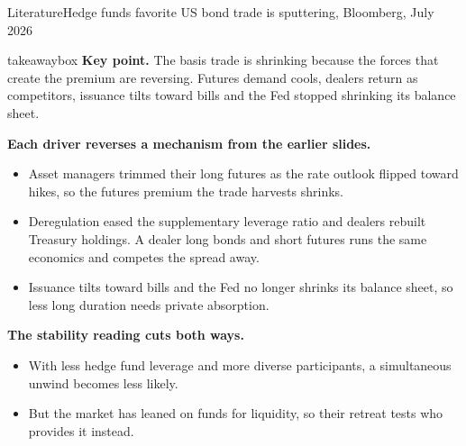 \documentclass[aspectratio=169,11pt]{beamer}
\newcommand{\keypoint}[1]{%
  \begin{beamercolorbox}[sep=0.6em,wd=\textwidth]{takeawaybox}
    \textbf{Key point.} #1
  \end{beamercolorbox}}
\begin{document}
\begin{frame}{Literature}{Hedge funds favorite US bond trade is sputtering, Bloomberg, July 2026}
  \footnotesize
  \keypoint{The basis trade is shrinking because the forces that create the premium are reversing. Futures demand cools, dealers return as competitors, issuance tilts toward bills and the Fed stopped shrinking its balance sheet.}
  \medskip
  \textbf{Each driver reverses a mechanism from the earlier slides.}
  \begin{itemize}
    \item Asset managers trimmed their long futures as the rate outlook flipped toward hikes, so the futures premium the trade harvests shrinks.
    \item Deregulation eased the supplementary leverage ratio and dealers rebuilt Treasury holdings. A dealer long bonds and short futures runs the same economics and competes the spread away.
    \item Issuance tilts toward bills and the Fed no longer shrinks its balance sheet, so less long duration needs private absorption.
  \end{itemize}
  \smallskip
  \textbf{The stability reading cuts both ways.}
  \begin{itemize}
    \item With less hedge fund leverage and more diverse participants, a simultaneous unwind becomes less likely.
    \item But the market has leaned on funds for liquidity, so their retreat tests who provides it instead.
  \end{itemize}
\end{frame}
\end{document}
